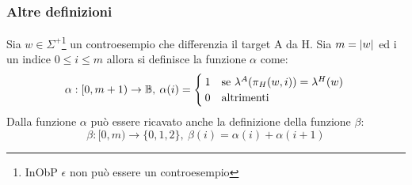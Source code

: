 \subsubsection{Altre definizioni}
Sia $w \in \Sigma^{+}$\footnote{In\ac{ObP} $\epsilon$ non può essere un controesempio} un controesempio che differenzia il target A da \ac{H}. Sia $m = \lvert w\rvert$ ed i un indice $0\leq i \leq m$ allora si definisce la funzione $\alpha$ come:
\begin{equation*}
\alpha: [0,m+1) \to \mathbb{B}, \: \alpha(i) = \begin{cases}
1
& \text{se } \lambda^{A}(\pi_{H}(w,i)) = \lambda^{H}(w) \\
0 & \text{altrimenti}\\
\end{cases}\\\\
\end{equation*}
Dalla funzione $\alpha$ può essere ricavato anche la definizione della funzione $\beta$:
\begin{equation*}
\label{equ:beta}
\beta: [0,m) \to \{0,1,2\}, \: \beta(i) = \alpha(i) + \alpha(i+1)
\end{equation*}
